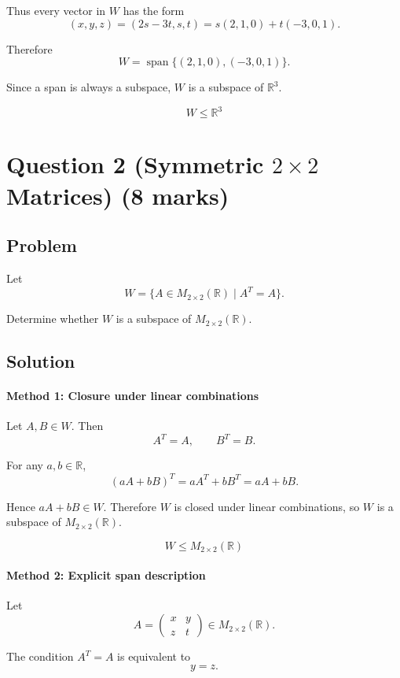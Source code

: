 \documentclass[12pt]{article}
\newcommand{\Span}{\operatorname{span}}
\begin{document}
Thus every vector in \(W\) has the form
\[
(x,y,z)=(2s-3t,s,t)=s(2,1,0)+t(-3,0,1).
\]

Therefore
\[
W=\Span\{(2,1,0),(-3,0,1)\}.
\]

Since a span is always a subspace, \(W\) is a subspace of \(\mathbb R^3\).

\[
\boxed{W\le \mathbb R^3}
\]

\newpage
\section{Question 2 (Symmetric \(2\times2\) Matrices) \hfill (8 marks)}
\subsection{Problem}

Let
\[
W=\{A\in M_{2\times2}(\mathbb R)\mid A^T=A\}.
\]

Determine whether \(W\) is a subspace of \(M_{2\times2}(\mathbb R)\).

\subsection{Solution}

\paragraph{Method 1: Closure under linear combinations}

Let \(A,B\in W\). Then
\[
A^T=A,\qquad B^T=B.
\]

For any \(a,b\in\mathbb R\),
\[
(aA+bB)^T=aA^T+bB^T=aA+bB.
\]

Hence \(aA+bB\in W\). Therefore \(W\) is closed under linear combinations, so \(W\) is a subspace of \(M_{2\times2}(\mathbb R)\).

\[
\boxed{W\le M_{2\times2}(\mathbb R)}
\]

\paragraph{Method 2: Explicit span description}

Let
\[
A=\begin{pmatrix}x&y\\ z&t\end{pmatrix}\in M_{2\times2}(\mathbb R).
\]

The condition \(A^T=A\) is equivalent to
\[
y=z.
\]
\end{document}
